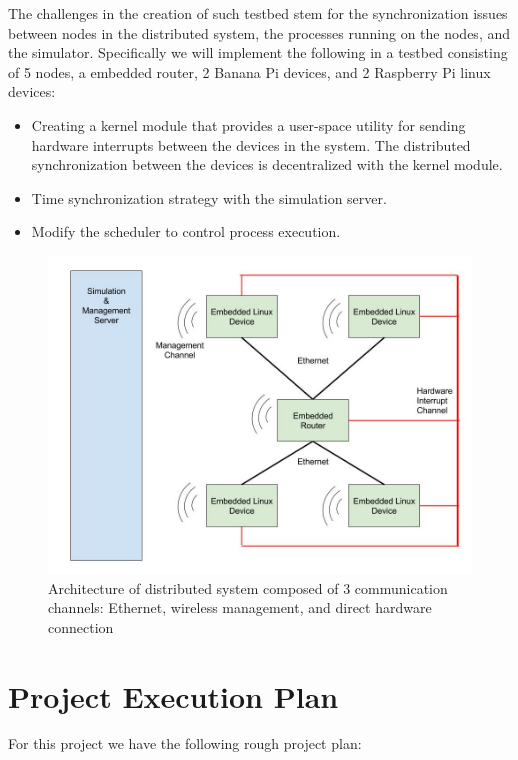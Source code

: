The challenges in the creation of such testbed stem for the synchronization issues between nodes in the distributed system, the processes running on the nodes, and the simulator. Specifically we will implement the following in a testbed consisting of 5 nodes, a embedded router, 2 Banana Pi devices, and 2 Raspberry Pi linux devices:

\begin{itemize}
\item Creating a kernel module that provides a user-space utility for sending hardware interrupts between the devices in the system.
The distributed synchronization between the devices is decentralized with the kernel module. 
  \item Time synchronization strategy with the simulation server.
  \item Modify the scheduler to control process execution.
\end{itemize}

\begin{figure}
  \centering
  \includegraphics[scale=0.5]{architecture.jpg}
  \caption{
    Architecture of distributed system composed of 3 communication channels: Ethernet, wireless management, and direct hardware connection
    }
\end{figure}


\section{Project Execution Plan}

For this project we have the following rough project plan:

